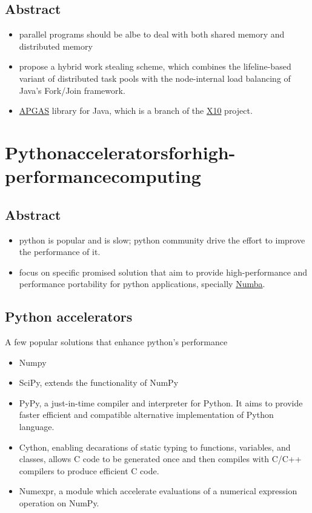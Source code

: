 \documentclass[11pt]{article}
\begin{document}
\subsection{Abstract}
\label{sec-8-1}
\begin{itemize}
\item parallel programs should be albe to deal with both shared memory and distributed memory
\item propose a hybrid work stealing scheme, which combines the lifeline-based variant of distributed task pools with the node-internal load balancing of Java's Fork/Join framework.
\item \href{http://x10-lang.org/releases/apgas-release-100.html}{APGAS} library for Java, which is a branch of the \href{http://x10-lang.org}{X10} project.
\end{itemize}
\section{Pythonacceleratorsforhigh-performancecomputing \cite{marowka17_python_accel_high_perfor_comput}}
\label{sec-9}
\subsection{Abstract}
\label{sec-9-1}
\begin{itemize}
\item python is popular and is slow; python community drive the effort to improve the performance of it.
\item focus on specific promised solution that aim to provide high-performance and performance portability for python applications, specially \href{http://numba.pydata.org}{Numba}.
\end{itemize}
\subsection{Python accelerators}
\label{sec-9-2}
A few popular solutions that enhance python's performance
\begin{itemize}
\item Numpy
\item SciPy, extends the functionality of NumPy
\item PyPy, a just-in-time compiler and interpreter for Python. It aims to provide faster efficient and compatible alternative implementation of Python language.
\item Cython, enabling decarations of static typing to functions, variables, and classes, allows C code to be generated once and then compiles with C/C++ compilers to produce efficient C code.
\item Numexpr, a module which accelerate evaluations of a numerical expression operation on NumPy.
\end{itemize}
\end{document}
